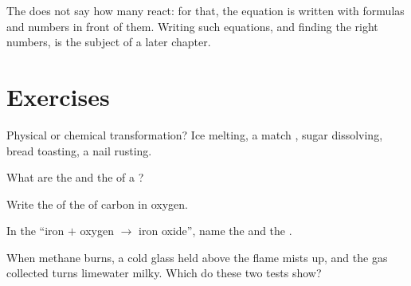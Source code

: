 \begin{remark}\label{rem:g7:chemical-reactions:counting}
The  does not say how many  react: for that, the
equation is written with formulas and numbers in front of them. Writing
such equations, and finding the right numbers, is the subject of a
later chapter.
\end{remark}

\section{Exercises}

\begin{exercise}[$\star$]\label{exo:g7:chemical-reactions:1}
Physical or chemical transformation? Ice melting, a match , sugar
dissolving, bread toasting, a nail rusting.
\end{exercise}

\begin{exercise}[$\star$]\label{exo:g7:chemical-reactions:2}
What are the  and the  of a ?
\end{exercise}

\begin{exercise}[$\star$]\label{exo:g7:chemical-reactions:3}
Write the  of the  of carbon in oxygen.
\end{exercise}

\begin{exercise}[$\star$]\label{exo:g7:chemical-reactions:4}
In the  ``iron $+$ oxygen $\longrightarrow$ iron oxide'',
name the  and the .
\end{exercise}

\begin{exercise}[$\star\star$]\label{exo:g7:chemical-reactions:5}
When methane burns, a cold glass held above the flame mists up, and the
gas collected turns limewater milky. Which  do these two tests
show?
\end{exercise}

